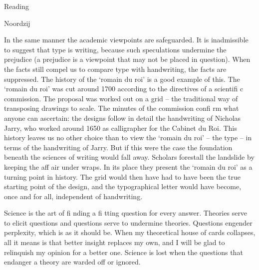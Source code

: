 \documentclass[11pt]{PalisadesLakesBook}
\begin{document}
\begin{plSection}{Reading}
\begin{plSection}{Noordzij}
\begin{plQuote}{}{}
In the same manner the academic viewpoints are safeguarded.
It is inadmissible to suggest that type is writing,
because such speculations undermine the prejudice (a prejudice
is a viewpoint that may not be placed in question).
When the facts still compel us to compare type with handwriting,
the facts are suppressed. The history of the ‘romain
du roi’ is a good example of this. The ‘romain du roi’ was cut
around 1700 according to the directives of a scientifi c commission.
The proposal was worked out on a grid – the traditional
way of transposing drawings to scale. The minutes of
the commission confi rm what anyone can ascertain: the designs
follow in detail the handwriting of Nicholas Jarry, who
worked around 1650 as calligrapher for the Cabinet du Roi.
This history leaves us no other choice than to view the ‘romain
du roi’ – the type – in terms of the handwriting of Jarry.
But if this were the case the foundation beneath the sciences
of writing would fall away. Scholars forestall the landslide by
keeping the aff air under wraps. In its place they present the
‘romain du roi’ as a turning point in history. The grid would
then have had to have been the true starting point of the design,
and the typographical letter would have become, once
and for all, independent of handwriting.
\end{plQuote}%

\begin{plQuote}{}{}
Science is the art of fi nding a fi tting question for every answer.
Theories serve to elicit questions and questions serve to
undermine theories. Questions engender perplexity, which
is as it should be. When my theoretical house of cards collapses,
all it means is that better insight replaces my own,
and I will be glad to relinquish my opinion for a better one.
Science is lost when the questions that endanger a theory are
warded off or ignored.
\end{plQuote}%



\end{plSection}
\end{plSection}
\end{document}
